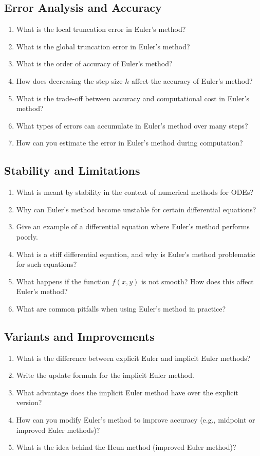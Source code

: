 \subsection{Error Analysis and Accuracy}
\begin{enumerate}[resume]
  \item What is the local truncation error in Euler's method?
  \item What is the global truncation error in Euler's method?
  \item What is the order of accuracy of Euler's method?
  \item How does decreasing the step size $h$ affect the accuracy of Euler's method?
  \item What is the trade-off between accuracy and computational cost in Euler's method?
  \item What types of errors can accumulate in Euler's method over many steps?
  \item How can you estimate the error in Euler's method during computation?
\end{enumerate}

\subsection{Stability and Limitations}
\begin{enumerate}[resume]
  \item What is meant by stability in the context of numerical methods for ODEs?
  \item Why can Euler's method become unstable for certain differential equations?
  \item Give an example of a differential equation where Euler's method performs poorly.
  \item What is a stiff differential equation, and why is Euler's method problematic for such equations?
  \item What happens if the function $f(x,y)$ is not smooth? How does this affect Euler's method?
  \item What are common pitfalls when using Euler's method in practice?
\end{enumerate}

\subsection{Variants and Improvements}
\begin{enumerate}[resume]
  \item What is the difference between explicit Euler and implicit Euler methods?
  \item Write the update formula for the implicit Euler method.
  \item What advantage does the implicit Euler method have over the explicit version?
  \item How can you modify Euler's method to improve accuracy (e.g., midpoint or improved Euler methods)?
  \item What is the idea behind the Heun method (improved Euler method)?
\end{enumerate}

